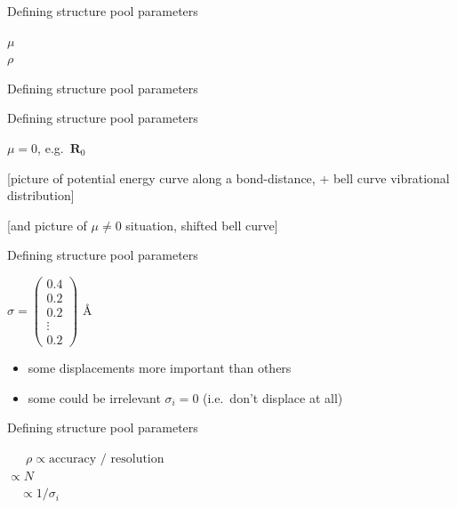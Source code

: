\documentclass{beamer}
\begin{document}
\begin{frame}{Defining structure pool parameters}
\begin{center}
	{\huge$\mu$}\qquad{}\\
	\vspace{2cm}
	{\huge$\rho$}
\end{center}
\end{frame}

\begin{frame}{Defining structure pool parameters}
	\begin{center}

	\end{center}
\end{frame}

\begin{frame}{Defining structure pool parameters}
		\begin{center}
	{\huge$\mu=0$, e.g.\ $\textbf{R}_0$}
		\end{center}
	
	[picture of potential energy curve along a bond-distance, + bell curve vibrational distribution]
	
	[and picture of $\mu\neq 0$ situation, shifted bell curve]
\end{frame}

\begin{frame}{Defining structure pool parameters}
		\begin{center}
	$\sigma=\begin{pmatrix}
	0.4 \\
	0.2\\
	0.2\\
	\vdots\\
	0.2
	\end{pmatrix}
	$ \AA
		\end{center}
	
	\begin{itemize}
		\item some displacements more important than others
		\item some could be irrelevant $\sigma_i = 0$ (i.e.\ don't displace at all)
	\end{itemize}

\end{frame}

\begin{frame}{Defining structure pool parameters}
		\begin{center}
	\qquad\qquad\qquad\ \ \ {\huge$\rho\propto\textrm{accuracy / resolution}$}\\
		\vspace{2mm}
	{\huge$\propto N$}\\
		\vspace{2mm}
	\quad\ \ {\huge$\propto 1/\sigma_i$}\\

		\end{center}

\end{frame}
\end{document}
